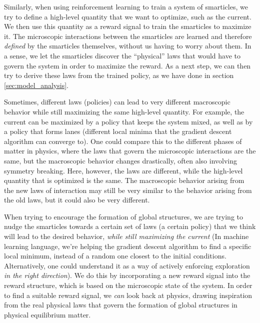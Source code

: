 Similarly, when using reinforcement learning to train a system of smarticles, we try to define a high-level quantity that we want to optimize, such as the current. We then use this quantity as a reward signal to train the smarticles to maximize it. The microscopic interactions between the smarticles are learned and therefore \textit{defined} by the smarticles themselves, without us having to worry about them. In a sense, we let the smarticles discover the \enquote{physical} laws that would have to govern the system in order to maximize the reward. As a next step, we can then try to derive these laws from the trained policy, as we have done in section \ref{sec:model_analysis}.


Sometimes, different laws (policies) can lead to very different macroscopic behavior while still maximizing the same high-level quantity. For example, the current can be maximized by a policy that keeps the system mixed, as well as by a policy that forms lanes (different local minima that the gradient descent algorithm can converge to). One could compare this to the different phases of matter in physics, where the laws that govern the microscopic interactions are the same, but the macroscopic behavior changes drastically, often also involving symmetry breaking. Here, however, the laws are different, while the high-level quantity that is optimized is the same. The macroscopic behavior arising from the new laws of interaction may still be very similar to the behavior arising from the old laws, but it could also be very different. 


When trying to encourage the formation of global structures, we are trying to nudge the smarticles towards a certain set of laws (a certain policy) that we think will lead to the desired behavior, \textit{while still maximizing the current} (In machine learning language, we're helping the gradient descent algorithm to find a specific local minimum, instead of a random one closest to the initial conditions. Alternatively, one could understand it as a way of actively enforcing exploration \textit{in the right direction}).  We do this by incorporating a new reward signal into the reward structure, which is based on the microscopic state of the system. In order to find a suitable reward signal, we \textit{can} look back at physics, drawing inspiration from the real physical laws that govern the formation of global structures in physical equilibrium matter.

